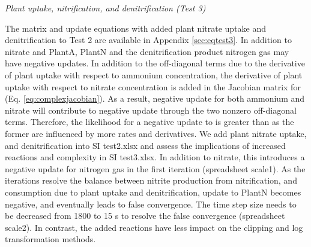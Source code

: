 \documentclass[gmd, manuscript]{copernicus}
\begin{document}
\noindent \emph{Plant uptake, nitrification, and denitrification (Test 3)}

The matrix and update equations with added plant nitrate uptake and
denitrification to Test 2 are available in Appendix \ref{sec:eqtest3}. In addition
to nitrate and PlantA, PlantN and the denitrification product nitrogen gas may
have negative updates. In addition to the off-diagonal terms due to the
derivative of plant uptake with respect to ammonium concentration, the
derivative of plant uptake with respect to nitrate concentration is added in
the Jacobian matrix for  (Eq. \ref{eq:complexjacobian}). As a
result, negative update for both ammonium and nitrate will contribute to
negative  update through the two nonzero off-diagonal terms.
Therefore, the likelihood for a negative update to   is greater
than  as
the former are influenced by more rates and derivatives. We add plant nitrate
uptake, and denitrification into SI test2.xlsx and
assess the implications of increased reactions and complexity in SI
test3.xlsx. In addition to nitrate, this introduces a negative update for
nitrogen gas in the first iteration (spreadsheet scale1).
As the iterations resolve the balance between nitrite production from
nitrification, and consumption due to plant uptake and denitrification, update
to PlantN becomes negative, and eventually leads to false convergence. The time
step size needs to be decreased from 1800 to 15 \unit{s} to resolve the false
convergence (spreadsheet scale2). In contrast, the added reactions have less
impact on the clipping and log transformation methods. 
\end{document}
